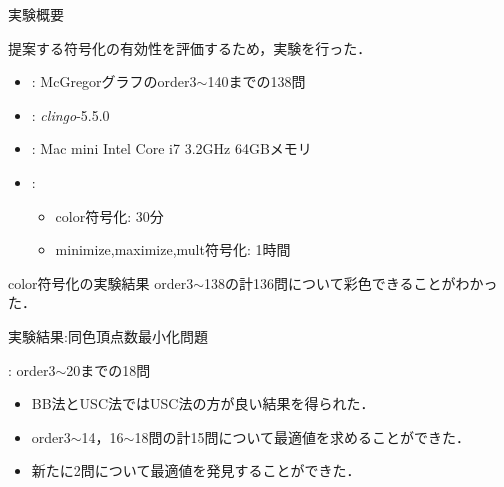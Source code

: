 \documentclass[dvipdfmx,11pt]{beamer}
\begin{document}
\begin{frame}{実験概要}
 \begin{block}{}
  提案する符号化の有効性を評価するため，実験を行った．
 \end{block}

 \begin{block}{}
  \begin{itemize}
   \item {}: McGregorグラフのorder3$\sim$140までの138問
   \item {}: \textit{clingo}-5.5.0
   \item {}: Mac mini Intel Core i7 3.2GHz 64GBメモリ
   \item {}: 
         \begin{itemize}
          \item color符号化: 30分
          \item minimize,maximize,mult符号化: 1時間
         \end{itemize}
  \end{itemize}  
 \end{block}

 \begin{alertblock}{color符号化の実験結果}
  order3$\sim$138の計136問について彩色できることがわかった．
 \end{alertblock}
 
\end{frame}


\begin{frame}{実験結果:同色頂点数最小化問題}

 \begin{block}{}
  : order3$\sim$20までの18問
 \end{block}

 \begin{center}
  
 \end{center}

 \begin{itemize}
  \item BB法とUSC法ではUSC法の方が良い結果を得られた．
  \item order3$\sim$14，16$\sim$18問の計15問について最適値を求めることができた．
  \item 新たに2問について最適値を発見することができた．
 \end{itemize}
 
\end{frame}
\end{document}
